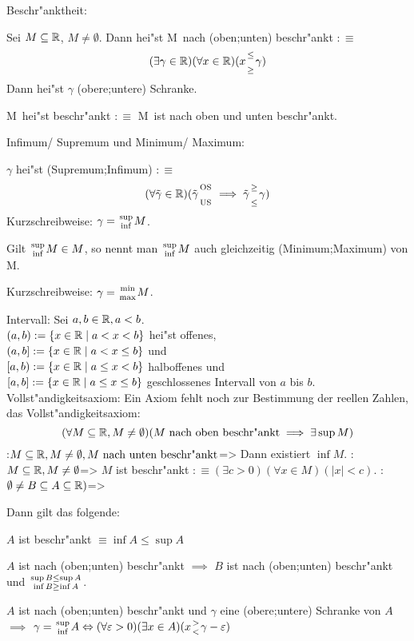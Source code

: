 Beschr"anktheit:{
  Sei $M \subseteq \mathbb R$, $M \ne \emptyset$. Dann hei"st
  M\ nach \tstack(oben;unten) beschr"ankt $:\equiv$
  \[(\exists \gamma\real)(\forall x \real)(x\stack(\le;\ge)\gamma)
    \]
  Dann hei"st $\gamma$ \tstack(obere;untere) Schranke.
  
  M\ hei"st beschr"ankt $:\equiv$ M\ ist nach oben und unten
  beschr"ankt.
  }
 Infimum/ Supremum und Minimum/ Maximum:{
  $\gamma$ hei"st \tstack(Supremum;Infimum) $:\equiv$
  \[(\forall \tilde\gamma \real)(\tilde\gamma
    \text{\tstack(OS;US)} \implies \tilde\gamma \stack(\ge;\le) \gamma)
    \]
  Kurzschreibweise: $\gamma=\stack(\sup;\inf)M$.
  
  Gilt $\stack(\sup;\inf)M \in M$, so nennt man $\stack(\sup;\inf)M$ auch
  gleichzeitig \tstack(Minimum;Maximum) von M.
  
  Kurzschreibweise: $\gamma=\stack(\min;\max)M$.
  }
 Intervall:{
  Sei $a,b \in\mathbb R,a<b$.\\
  $(a,b):=\left\{x\in\mathbb R\mid a<x<b\right\}$ hei"st offenes,\\
  $(a,b]:=\left\{x\in\mathbb R\mid a<x\le b\right\}$ und\\
  $[a,b):=\left\{x\in\mathbb R\mid a\le x< b\right\}$ halboffenes und\\
  $[a,b]:=\left\{x\in\mathbb R\mid a\le x\le b\right\}$ geschlossenes Intervall von
  $a$ bis $b$.
  }
 Vollst"andigkeitsaxiom:{
  Ein Axiom fehlt noch zur Bestimmung der reellen Zahlen,
  das Vollst"andigkeitsaxiom:
  \[(\forall M \subseteq \mathbb R,M \ne \emptyset)
      (M \text{ nach oben beschr"ankt} \implies \exists \sup M)
    \]
  }
\theorem:$M \subseteq \mathbb R,M \ne \emptyset,M
  \text{ nach unten beschr"ankt}$=>{
  Dann existiert $\inf M$.
  }
\lessertheorem:$M \subseteq \mathbb R,M \ne \emptyset$=>{
  $M$ ist beschr"ankt $:\equiv (\exists c>0)(\forall x \in M)(|x|<c)$.
  }
\theorem:$\emptyset\ne B\subseteq A\subseteq \mathbb R)$=>{
  Dann gilt das folgende:
  \begin{stmts}
    \item $A$ ist beschr"ankt $\equiv\inf A\le\sup A$
    \item $A$ ist nach \tstack(oben;unten) beschr"ankt $\implies$
      $B$ ist nach \tstack(oben;unten) beschr"ankt und
      $\stack(\sup B\le\sup A;\inf B \ge\inf A)$.
    \item $A$ ist nach \tstack(oben;unten) beschr"ankt und
      $\gamma$ eine \tstack(obere;untere) Schranke von $A$ $\implies$
      $\gamma=\stack(\sup;\inf)A \equiv (\forall \varepsilon>0)
      (\exists x\in A)(x\stack(>;<)\gamma-\epsilon)$
    \end{stmts}
  }
